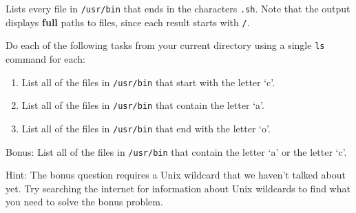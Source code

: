 \documentclass[
  letterpaper,
  DIV=11,
  numbers=noendperiod]{scrreprt}
\newenvironment{Shaded}{\begin{snugshade}}{\end{snugshade}}
\newcommand{\CommentTok}[1]{\textcolor[rgb]{0.37,0.37,0.37}{#1}}
\newcommand{\ExtensionTok}[1]{\textcolor[rgb]{0.00,0.23,0.31}{#1}}
\newcommand{\NormalTok}[1]{\textcolor[rgb]{0.00,0.23,0.31}{#1}}
\newcommand{\PreprocessorTok}[1]{\textcolor[rgb]{0.68,0.00,0.00}{#1}}
\newcommand{\SpecialStringTok}[1]{\textcolor[rgb]{0.13,0.47,0.30}{#1}}
\providecommand{\tightlist}{%
  \setlength{\itemsep}{0pt}\setlength{\parskip}{0pt}}\usepackage{longtable,booktabs,array}
\begin{document}
Lists every file in \texttt{/usr/bin} that ends in the characters
\texttt{.sh}. Note that the output displays \textbf{full} paths to
files, since each result starts with \texttt{/}.

\begin{tcolorbox}[enhanced jigsaw, opacitybacktitle=0.6, colback=white, coltitle=black, opacityback=0, rightrule=.15mm, toptitle=1mm, toprule=.15mm, bottomtitle=1mm, colframe=quarto-callout-caution-color-frame, arc=.35mm, titlerule=0mm, colbacktitle=quarto-callout-caution-color!10!white, leftrule=.75mm, title={Exercise}, breakable, bottomrule=.15mm, left=2mm]

Do each of the following tasks from your current directory using a
single \texttt{ls} command for each:

\begin{enumerate}
\def\labelenumi{\arabic{enumi}.}
\tightlist
\item
  List all of the files in \texttt{/usr/bin} that start with the letter
  `c'.
\item
  List all of the files in \texttt{/usr/bin} that contain the letter
  `a'.
\item
  List all of the files in \texttt{/usr/bin} that end with the letter
  `o'.
\end{enumerate}

Bonus: List all of the files in \texttt{/usr/bin} that contain the
letter `a' or the letter `c'.

Hint: The bonus question requires a Unix wildcard that we haven't talked
about yet. Try searching the internet for information about Unix
wildcards to find what you need to solve the bonus problem.

\end{tcolorbox}

\begin{tcolorbox}[enhanced jigsaw, opacitybacktitle=0.6, colback=white, coltitle=black, opacityback=0, rightrule=.15mm, toptitle=1mm, toprule=.15mm, bottomtitle=1mm, colframe=quarto-callout-caution-color-frame, arc=.35mm, titlerule=0mm, colbacktitle=quarto-callout-caution-color!10!white, leftrule=.75mm, title={Solution}, breakable, bottomrule=.15mm, left=2mm]

\begin{Shaded}
\end{Shaded}

\end{tcolorbox}
\end{document}
